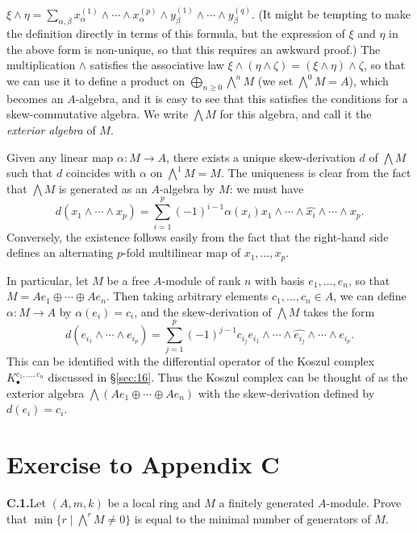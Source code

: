 \begin{enumerate}[(5)]
        $\xi \wedge \eta = \sum_{\alpha, \beta} x_\alpha^{(1)} \wedge \cdots \wedge x_\alpha^{(p)}
        \wedge y_\beta^{(1)} \wedge \cdots \wedge y_\beta^{(q)}$. (It might be tempting to make the
        definition directly in terms of this formula, but the expression of $\xi$ and
        $\eta$ in the above form is non-unique, so that this requires an awkward
        proof.) The multiplication $\wedge$ satisfies the associative law
        $\xi \wedge (\eta \wedge \zeta) = (\xi \wedge \eta) \wedge \zeta$, so that we can use it to define a
        product on $\bigoplus_{n \ge 0} \bigwedge^n M$ (we set $\bigwedge^0 M = A$), which becomes an
        $A$-algebra, and it is easy to see that this satisfies the conditions for a
        skew-commutative algebra. We write $\bigwedge M$ for this algebra, and call it
        the \emph{exterior algebra} of $M$.

        Given any linear map $\alpha\colon M \to A$, there exists a unique skew-derivation
        $d$ of $\bigwedge M$ such that $d$ coincides with $\alpha$ on
        $\bigwedge^1 M = M$. The uniqueness is clear from the fact that $\bigwedge M$ is
        generated as an $A$-algebra by $M$: we must have
        \[
          d(x_1 \wedge \cdots \wedge x_p) = \sum_{i=1}^{p} (-1)^{i-1}\alpha(x_i)x_1
              \wedge \cdots \wedge \widehat{x_i} \wedge \cdots \wedge x_p.
        \]
        Conversely, the existence follows easily from the fact that the right-hand
        side defines an alternating $p$-fold multilinear map of $x_1, \ldots, x_p$.

        In particular, let $M$ be a free $A$-module of rank $n$ with basis
        $e_1, \ldots, e_n$, so that $M = Ae_1 \oplus \cdots \oplus Ae_n$. Then taking arbitrary
        elements $c_1, \ldots, c_n \in A$, we can define $\alpha\colon M \to A$ by
        $\alpha(e_i) = c_i$, and the skew-derivation of $\bigwedge M$ takes the form
        \[
          d(e_{i_1} \wedge \cdots \wedge e_{i_p}) = \sum_{j=1}^{p} (-1)^{j-1}c_{i_j}
              e_{i_1} \wedge \cdots \wedge \widehat{e_{i_j}} \wedge \cdots \wedge e_{i_p}.
        \]
        This can be identified with the differential operator of the Koszul complex
        $K_{\bullet}^{c_1, \ldots, c_n}$ discussed in \S\ref{sec:16}. Thus the Koszul complex can be
        thought of as the exterior algebra $\bigwedge(Ae_1 \oplus \cdots \oplus Ae_n)$ with the
        skew-derivation defined by $d(e_i) = c_i$.
\end{enumerate}

\section*{Exercise to Appendix C}

\noindent\textbf{C.1.}\quad Let $(A, m, k)$ be a local ring and $M$ a finitely generated
$A$-module. Prove that $\min\{r \mid \bigwedge^r M \ne 0\}$ is equal to the minimal number of
generators of $M$.
